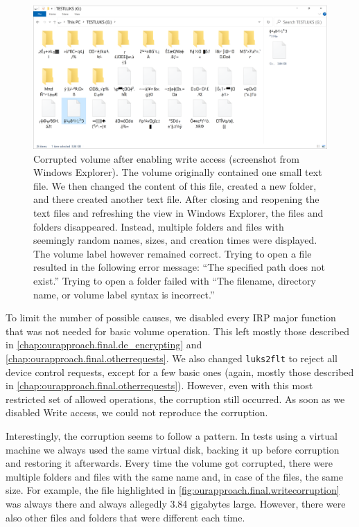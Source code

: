 \begin{figure}[htb!]
	\center
	\includegraphics[scale=0.47]{../img/ourapproach.final.writecorruption.png}
	\caption[
		Corrupted volume after enabling write access
	]{
		Corrupted volume after enabling write access (screenshot from Windows Explorer). The volume originally contained one small text file. We then changed the content of this file, created a new folder, and there created another text file. After closing and reopening the text files and refreshing the view in Windows Explorer, the files and folders disappeared. Instead, multiple folders and files with seemingly random names, sizes, and creation times were displayed. The volume label however remained correct. Trying to open a file resulted in the following error message: ``The specified path does not exist.'' Trying to open a folder failed with ``The filename, directory name, or volume label syntax is incorrect.''
	}
	\label{fig:ourapproach.final.writecorruption}
\end{figure}

To limit the number of possible causes, we disabled every IRP major function that was not needed for basic volume operation. This left mostly those described in \autoref{chap:ourapproach.final.de_encrypting} and \autoref{chap:ourapproach.final.otherrequests}. We also changed \texttt{luks2flt} to reject all device control requests, except for a few basic ones (again, mostly those described in \autoref{chap:ourapproach.final.otherrequests}). However, even with this most restricted set of allowed operations, the corruption still occurred. As soon as we disabled Write access, we could not reproduce the corruption.

Interestingly, the corruption seems to follow a pattern. In tests using a virtual machine we always used the same virtual disk, backing it up before corruption and restoring it afterwards. Every time the volume got corrupted, there were multiple folders and files with the same name and, in case of the files, the same size. For example, the file highlighted in \autoref{fig:ourapproach.final.writecorruption} was always there and always allegedly 3.84 gigabytes large. However, there were also other files and folders that were different each time.


